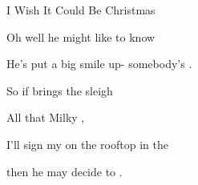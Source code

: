 \begin{SBSong}{I Wish It Could Be Christmas}
\begin{SBVerse}
    Oh well he  might like to know

    He's put a  big smile up- somebody's . 

    So if  brings the sleigh

    All  that Milky ,

    I'll sign my  on the rooftop in the

     then he may decide to . 
  \end{SBVerse}
\end{SBSong}
